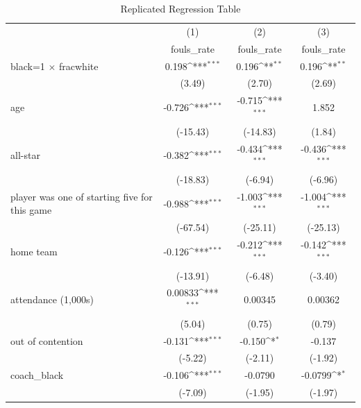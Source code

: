 \begin{table}[htbp]\centering
\def\sym#1{\ifmmode^{#1}\else\(^{#1}\)\fi}
\caption{Replicated Regression Table \label{tab2}}
\begin{tabular}{l*{3}{c}}
\hline\hline
                    &\multicolumn{1}{c}{(1)}&\multicolumn{1}{c}{(2)}&\multicolumn{1}{c}{(3)}\\
                    &\multicolumn{1}{c}{fouls\_rate}&\multicolumn{1}{c}{fouls\_rate}&\multicolumn{1}{c}{fouls\_rate}\\
\hline
black=1 $\times$ fracwhite&       0.198\sym{***}&       0.196\sym{**} &       0.196\sym{**} \\
                    &      (3.49)         &      (2.70)         &      (2.69)         \\
[1em]
age                 &      -0.726\sym{***}&      -0.715\sym{***}&       1.852         \\
                    &    (-15.43)         &    (-14.83)         &      (1.84)         \\
[1em]
all-star            &      -0.382\sym{***}&      -0.434\sym{***}&      -0.436\sym{***}\\
                    &    (-18.83)         &     (-6.94)         &     (-6.96)         \\
[1em]
player was one of starting five for this game&      -0.988\sym{***}&      -1.003\sym{***}&      -1.004\sym{***}\\
                    &    (-67.54)         &    (-25.11)         &    (-25.13)         \\
[1em]
home team           &      -0.126\sym{***}&      -0.212\sym{***}&      -0.142\sym{***}\\
                    &    (-13.91)         &     (-6.48)         &     (-3.40)         \\
[1em]
attendance (1,000s) &     0.00833\sym{***}&     0.00345         &     0.00362         \\
                    &      (5.04)         &      (0.75)         &      (0.79)         \\
[1em]
out of contention   &      -0.131\sym{***}&      -0.150\sym{*}  &      -0.137         \\
                    &     (-5.22)         &     (-2.11)         &     (-1.92)         \\
[1em]
coach\_black         &      -0.106\sym{***}&     -0.0790         &     -0.0799\sym{*}  \\
                    &     (-7.09)         &     (-1.95)         &     (-1.97)         \\

\end{tabular}
\end{table}

